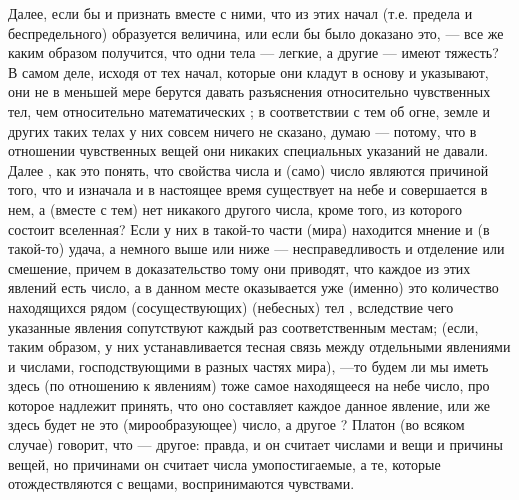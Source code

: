 \documentclass{article}
\begin{document}
Далее, если бы и признать вместе с ними, что из этих начал (т.е. предела и беспредельного) образуется величина, или если бы было доказано это, — все же каким образом получится, что одни тела — легкие, а другие — имеют тяжесть? В самом деле, исходя от тех начал, которые они кладут в основу и указывают, они не в меньшей мере берутся давать разъяснения относительно чувственных тел, чем относительно математических
\footnotemark[17]
; в соответствии с тем об огне, земле и других таких телах у них совсем ничего не сказано, думаю — потому, что в отношении чувственных вещей они никаких специальных указаний не давали. Далее
\footnotemark[18]
, как это понять, что свойства числа и (само) число являются причиной того, что и изначала и в настоящее время существует на небе и совершается в нем, а (вместе с тем) нет никакого другого числа, кроме того, из которого состоит вселенная? Если у них в такой-то части (мира) находится мнение и (в такой-то) удача, а немного выше или ниже — несправедливость и отделение или смешение, причем в доказательство тому они приводят, что каждое из этих явлений есть число, а в данном месте оказывается уже (именно) это количество находящихся рядом (сосуществующих) (небесных) тел
\footnotemark[19]
, вследствие чего
\footnotemark[20]
указанные явления сопутствуют каждый раз соответственным местам; (если, таким образом, у них устанавливается тесная связь между отдельными явлениями и числами, господствующими в разных частях мира), —то будем ли мы иметь здесь (по отношению к явлениям) тоже самое находящееся на небе число, про которое надлежит принять, что оно составляет каждое данное явление, или же здесь будет не это (мирообразующее) число, а другое
\footnotemark[21]
? Платон (во всяком случае) говорит, что — другое: правда, и он считает числами и вещи и причины вещей, но причинами он считает числа умопостигаемые, а те, которые отождествляются с вещами, воспринимаются чувствами.
\end{document}
